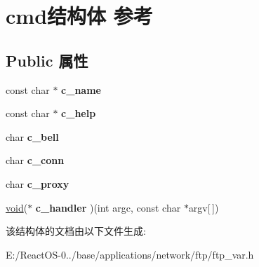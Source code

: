 \hypertarget{structcmd}{}\section{cmd结构体 参考}
\label{structcmd}
\subsection*{Public 属性}
\begin{DoxyCompactItemize}
\item 
\mbox{\label{structcmd_af40be0835475be39518778206ac20e1d}} 
const char $\ast$ {\bfseries c\+\_\+name}
\item 
\mbox{\label{structcmd_a80cdb976e5e618461326d8986b1ce16c}} 
const char $\ast$ {\bfseries c\+\_\+help}
\item 
\mbox{\label{structcmd_a2ebc5571c4f631c7944f3698c2e75765}} 
char {\bfseries c\+\_\+bell}
\item 
\mbox{\label{structcmd_aafde321d68e064eafa081047403be4d5}} 
char {\bfseries c\+\_\+conn}
\item 
\mbox{\label{structcmd_a5f21d8a78e4a0b07ed5a9b8439d3b474}} 
char {\bfseries c\+\_\+proxy}
\item 
\mbox{\label{structcmd_a55889594a5a8c56b3bd396e53a59c9fa}} 
\hyperlink{interfacevoid}{void}($\ast$ {\bfseries c\+\_\+handler} )(int argc, const char $\ast$argv\mbox{[}$\,$\mbox{]})
\end{DoxyCompactItemize}


该结构体的文档由以下文件生成\+:\begin{DoxyCompactItemize}
\item 
E\+:/\+React\+O\+S-\/0../base/applications/network/ftp/ftp\+\_\+var.\+h\end{DoxyCompactItemize}
